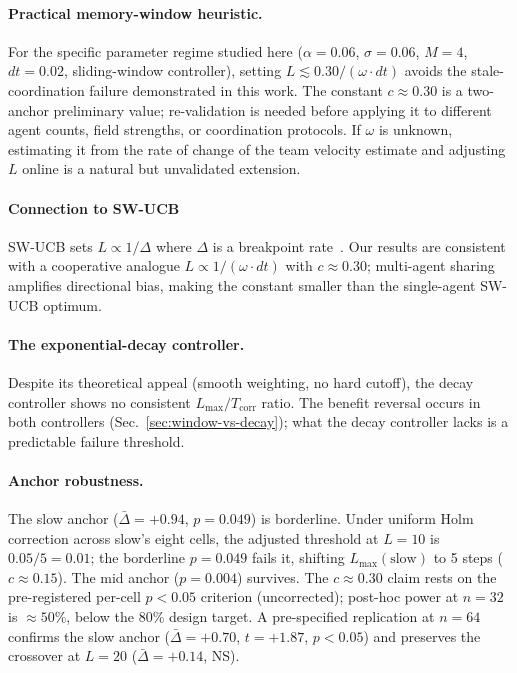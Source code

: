 \documentclass[sigconf,anonymous]{aamas}
\newcommand{\Dbar}{\bar{\Delta}}
\newcommand{\Lmax}{L_{\max}}
\newcommand{\Tcorr}{T_{\mathrm{corr}}}
\newcommand{\omdt}{\omega\!\cdot\!dt}
\begin{document}
\paragraph{Practical memory-window heuristic.}
For the specific parameter regime studied here
($\alpha{=}0.06$, $\sigma{=}0.06$, $M{=}4$, $dt{=}0.02$,
sliding-window controller), setting $L \lesssim 0.30/(\omdt)$
avoids the stale-coordination failure demonstrated in this work.
The constant $c \approx 0.30$ is a two-anchor preliminary value;
re-validation is needed before applying it to different agent
counts, field strengths, or coordination protocols.
If $\omega$ is unknown, estimating it from the rate of change
of the team velocity estimate and adjusting $L$ online is a
natural but unvalidated extension.

\paragraph{Connection to SW-UCB}
SW-UCB sets $L \propto 1/\Delta$ where $\Delta$ is a breakpoint
rate~\cite{garivier2011swucb}.  Our results are consistent with a
cooperative analogue $L \propto 1/(\omdt)$ with $c \approx 0.30$;
multi-agent sharing amplifies directional bias, making the constant
smaller than the single-agent SW-UCB optimum.

\paragraph{The exponential-decay controller.}
Despite its theoretical appeal (smooth weighting, no hard cutoff),
the decay controller shows no consistent $\Lmax/\Tcorr$ ratio.
The benefit reversal occurs in both controllers
(Sec.~\ref{sec:window-vs-decay}); what the decay controller lacks
is a predictable failure threshold.

\paragraph{Anchor robustness.}
The slow anchor ($\Dbar{=}{+}0.94$, $p{=}0.049$) is borderline.
Under uniform Holm correction across slow's eight cells, the adjusted
threshold at $L{=}10$ is $0.05/5{=}0.01$; the borderline $p{=}0.049$
fails it, shifting $\Lmax(\text{slow})$ to 5 steps ($c{\approx}0.15$).
The mid anchor ($p{=}0.004$) survives.
The $c{\approx}0.30$ claim rests on the pre-registered per-cell
$p{<}0.05$ criterion (uncorrected); post-hoc power at $n{=}32$ is
${\approx}50\%$, below the 80\% design target.
A pre-specified replication at $n{=}64$ confirms the slow anchor
($\Dbar{=}{+}0.70$, $t{=}{+}1.87$, $p{<}0.05$) and preserves
the crossover at $L{=}20$ ($\Dbar{=}{+}0.14$, NS).
\end{document}
